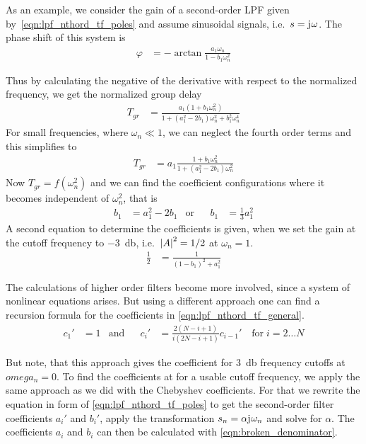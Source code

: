 As an example, we consider the gain of a second-order \ac{LPF} given by~\eqref{eqn:lpf_nthord_tf_poles} and assume sinusoidal signals, i.e.\ $s=\mathrm{j}\mkern1mu\omega$. The phase shift of this system is
\begin{align}
  \varphi &= -\arctan\frac{a_1\omega_n}{1-b_1\omega_n^2}
\end{align}

Thus by calculating the negative of the derivative with respect to the normalized frequency, we get the normalized group delay
\begin{align}
  T_{gr} &= \frac{a_1(1+b_1\omega_n^2)}{1+(a_1^2-2b_1)\omega_n^2+b_1^2\omega_n^4}
\end{align}
For small frequencies, where $\omega_n\ll 1$, we can neglect the fourth order terms and this simplifies to
\begin{align}
  T_{gr} &= a_1\frac{1+b_1\omega_n^2}{1+(a_1^2-2b_1)\omega_n^2}
\end{align}
Now $T_{gr}=f(\omega_n^2)$ and we can find the coefficient configurations where it becomes independent of $\omega_n^2$, that is
\begin{align}
  &&b_1 &= a_1^2-2b_1 &\text{or}& &b_1 &= \frac{1}{3}a_1^2&&
\end{align}
A second equation to determine the coefficients is given, when we set the gain at the cutoff frequency to \SI{-3}{\decibel}, i.e.\ $\abs{A}^2=1/2$ at $\omega_n=1$.
\begin{align}
  \frac{1}{2} &= \frac{1}{(1-b_1)^2+a_1^2}
\end{align}

The calculations of higher order filters become more involved, since a system of nonlinear equations arises. But using a different approach one can find a recursion formula for the coefficients in \eqref{eqn:lpf_nthord_tf_general}.
\begin{align}
  &&c_1' &= 1 &\text{and}&  &c_i' &= \frac{2(N-i+1)}{i(2N-i+1)}c_{i-1}'\quad\text{for}\;i=2\dots N&&
\end{align}

But note, that this approach gives the coefficient for \SI{3}{\decibel} frequency cutoffs at $omega_n=0$. To find the coefficients at for a usable cutoff frequency, we apply the same approach as we did with the Chebyshev coefficients. For that we rewrite the equation in form of \eqref{eqn:lpf_nthord_tf_poles} to get the second-order filter coefficients $a_i'$ and $b_i'$, apply the transformation $s_n=\alpha\mathrm{j}\mkern1mu\omega_n$ and solve for $\alpha$. The coefficients $a_i$ and $b_i$ can then be calculated with \eqref{eqn:broken_denominator}.

